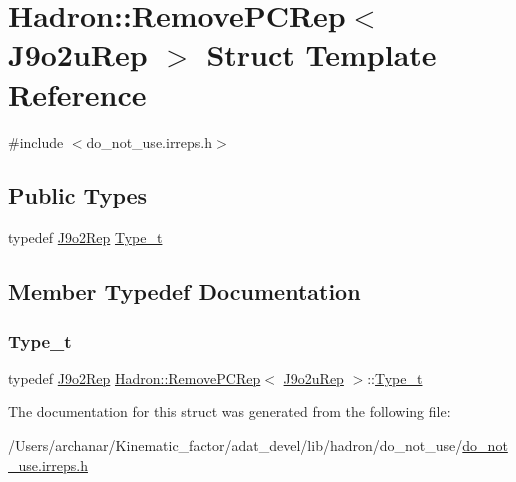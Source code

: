 \hypertarget{structHadron_1_1RemovePCRep_3_01J9o2uRep_01_4}{}\section{Hadron\+:\+:Remove\+P\+C\+Rep$<$ J9o2u\+Rep $>$ Struct Template Reference}
\label{structHadron_1_1RemovePCRep_3_01J9o2uRep_01_4}


{\ttfamily \#include $<$do\+\_\+not\+\_\+use.\+irreps.\+h$>$}

\subsection*{Public Types}
\begin{DoxyCompactItemize}
\item 
typedef \mbox{\hyperlink{structHadron_1_1J9o2Rep}{J9o2\+Rep}} \mbox{\hyperlink{structHadron_1_1RemovePCRep_3_01J9o2uRep_01_4_a572fc7879fdcb65d910768ea4cbd0dd4}{Type\+\_\+t}}
\end{DoxyCompactItemize}


\subsection{Member Typedef Documentation}
\mbox{\label{structHadron_1_1RemovePCRep_3_01J9o2uRep_01_4_a572fc7879fdcb65d910768ea4cbd0dd4}} 
\subsubsection{\texorpdfstring{Type\_t}{Type\_t}}
{\footnotesize\ttfamily typedef \mbox{\hyperlink{structHadron_1_1J9o2Rep}{J9o2\+Rep}} \mbox{\hyperlink{structHadron_1_1RemovePCRep}{Hadron\+::\+Remove\+P\+C\+Rep}}$<$ \mbox{\hyperlink{structHadron_1_1J9o2uRep}{J9o2u\+Rep}} $>$\+::\mbox{\hyperlink{structHadron_1_1RemovePCRep_3_01J9o2uRep_01_4_a572fc7879fdcb65d910768ea4cbd0dd4}{Type\+\_\+t}}}



The documentation for this struct was generated from the following file\+:\begin{DoxyCompactItemize}
\item 
/\+Users/archanar/\+Kinematic\+\_\+factor/adat\+\_\+devel/lib/hadron/do\+\_\+not\+\_\+use/\mbox{\hyperlink{do__not__use_8irreps_8h}{do\+\_\+not\+\_\+use.\+irreps.\+h}}\end{DoxyCompactItemize}
